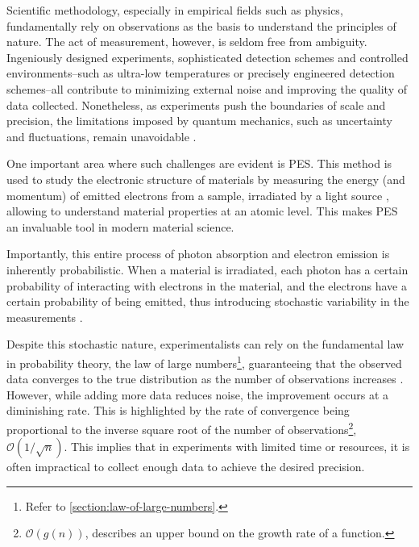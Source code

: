 Scientific methodology, especially in empirical fields such as physics, fundamentally rely on observations as the basis to understand the principles of nature. The act of measurement, however, is seldom free from ambiguity. Ingeniously designed experiments, sophisticated detection schemes and controlled environments--such as ultra-low temperatures or precisely engineered detection schemes--all contribute to minimizing external noise and improving the quality of data collected. Nonetheless, as experiments push the boundaries of scale and precision, the limitations imposed by quantum mechanics, such as uncertainty and fluctuations, remain unavoidable \cite{heisenbergPhysicalPrinciplesQuantum2009,sakuraiModernQuantumMechanics2020,binneyPhysicsQuantumMechanics2014}.

One important area where such challenges are evident is \gls{PES}. This method is used to study the electronic structure of materials by measuring the energy (and momentum) of emitted electrons from a sample, irradiated by a light source \cite{cardonaGeneralPrinciples1978}, allowing to understand material properties at an atomic level. This makes \gls{PES} an invaluable tool in modern material science. 

Importantly, this entire process of photon absorption and electron emission is inherently probabilistic. When a material is irradiated, each photon has a certain probability of interacting with electrons in the material, and the electrons have a certain probability of being emitted, thus introducing stochastic variability in the measurements \cite{sakuraiModernQuantumMechanics2020}.

Despite this stochastic nature, experimentalists can rely on the fundamental law in probability theory, the law of large numbers\footnote{Refer to \cref{section:law-of-large-numbers}.}, guaranteeing that the observed data converges to the true distribution as the number of observations increases \cite{fellerIntroductionProbabilityTheory1991a}. However, while adding more data reduces \gls{noise}, the improvement occurs at a diminishing rate. This is highlighted by the rate of convergence being proportional to the inverse square root of the number of observations\footnote{$\mathcal{O}(g(n))$, describes an upper bound on the growth rate of a function.}, $\mathcal{O}(1/\sqrt{n})$. This implies that in experiments with limited time or resources, it is often impractical to collect enough data to achieve the desired precision.

